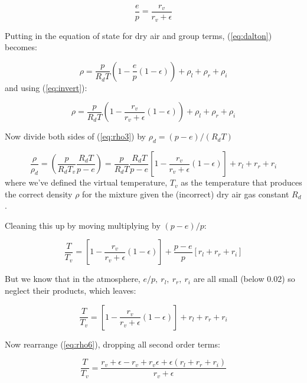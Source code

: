 \documentclass[12pt]{article}
\begin{document}
\begin{equation}
  \label{eq:invert}
  \frac{e}{p} = \frac{r_v}{r_v + \epsilon}
\end{equation}

Putting in the equation of state for dry air and group terms, (\ref{eq:dalton}) becomes:

\begin{equation}
  \label{eq:rho2}
      \rho = \frac{p}{R_d T} \left ( 1 - \frac{e}{p} (1 - \epsilon) \right ) + \rho_l + \rho_r + \rho_i
\end{equation}
and using (\ref{eq:invert}):

\begin{equation}
  \label{eq:rho3}
      \rho = \frac{p}{R_d T} \left ( 1 - \frac{r_v}{r_v + \epsilon} (1 - \epsilon) \right ) + \rho_l + \rho_r + \rho_i
\end{equation}

Now divide both sides of (\ref{eq:rho3}) by $\rho_d = (p-e)/(R_d T)$

\begin{equation}
  \label{eq:rho4}
  \frac{\rho}{\rho_d} = \left ( \frac{p}{R_d T_v} \frac{R_d T}{p -e} \right ) =
\frac{p}{R_d T} \frac{R_d T}{p-e} \left [ 1 -  \frac{r_v}{r_v + \epsilon} (1 - \epsilon) \right ] + r_l + r_r  + r_i
\end{equation}
where we've defined the virtual temperature, $T_v$ as the temperature that produces the correct
density $\rho$ for the mixture given the (incorrect) dry air gas constant $R_d$.

Cleaning this up by moving multiplying by $(p-e)/p$:

\begin{equation}
  \label{eq:rho5}
 \frac{T}{ T_v} = 
 \left [ 1 -  \frac{r_v}{r_v + \epsilon} (1 - \epsilon) \right ] +  \frac{p-e}{p} \left [ r_l + r_r  + r_i \right ] 
\end{equation}

But we know that in the atmosphere, $e/p,\ r_l,\ r_r,\ r_i$ are all small (below 0.02) so 
neglect their products, which leaves:

\begin{equation}
  \label{eq:rho6}
 \frac{T}{ T_v} = 
 \left [ 1 -  \frac{r_v}{r_v + \epsilon} (1 - \epsilon) \right ] +   r_l + r_r  + r_i 
\end{equation}
 
Now rearrange (\ref{eq:rho6}), dropping all second order terms:

\begin{equation}
  \label{eq:rho7}
 \frac{T}{T_v} = \frac{r_v + \epsilon - r_v + r_v \epsilon + \epsilon (r_l + r_r + r_i) }{r_v + \epsilon}
\end{equation}
\end{document}
